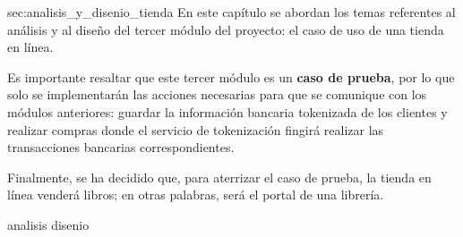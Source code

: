 %
%

  {sec:analisis_y_disenio_tienda}{%
  }
%
En este capítulo se abordan los temas referentes al análisis y al diseño del
tercer módulo del proyecto: el caso de uso de una tienda en línea.

Es importante resaltar que este tercer módulo es un \textbf{caso de prueba},
por lo que solo se implementarán las acciones necesarias para que se comunique
con los módulos anteriores: guardar la información bancaria tokenizada de los
clientes y realizar compras donde el servicio de tokenización fingirá realizar
las transacciones bancarias correspondientes.

Finalmente, se ha decidido que, para aterrizar el caso de prueba, la tienda en
línea venderá libros; en otras palabras, será el portal de una librería.

{analisis}
{disenio}
